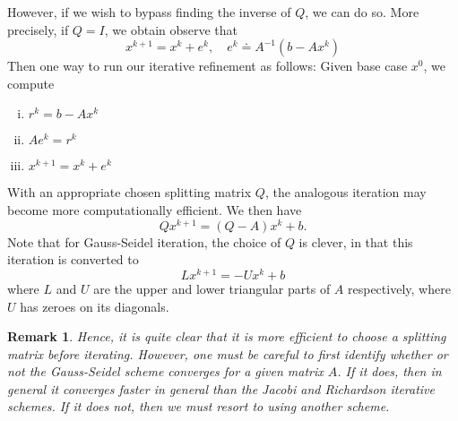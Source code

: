 \documentclass[12pt,reqno]{amsart}
\numberwithin{equation}{section}  %
\newtheorem{remark}[theorem]{Remark}
\begin{document}
However, if we wish to bypass finding the inverse of $Q$, we can do so. More precisely, if
$Q = I$, we obtain
observe that
\begin{equation*}
x^{k+1} = x^{k} + e^{k}, \quad e^{k} \doteq A^{-1}(b - Ax^{k})
\end{equation*}
Then one way to run our iterative refinement as follows: Given base case $x^{0}$, we compute 
\begin{enumerate}[i)]
\item $r^{k} = b - Ax^{k}$
\item $Ae^{k} = r^{k}$
\item $x^{k+1} = x^{k} + e^{k}$
\end{enumerate}
With an appropriate chosen splitting matrix $Q$, the analogous iteration may become
more computationally efficient. We then have
\begin{equation*}
Qx^{k+1} = (Q - A)x^{k} + b.
\end{equation*}
Note that for Gauss-Seidel iteration, the choice of $Q$ is clever, in that this
iteration  is converted to 
\begin{equation*}
L x^{k+1} = - U x^{k} + b
\end{equation*}
where $L$ and $U$ are the upper and lower triangular parts of $A$ respectively,
where $U$ has zeroes on its diagonals. 

\begin{remark}
Hence, it is quite clear that it is more efficient to choose a splitting matrix
before iterating. However, one must be careful to first identify whether or not
the Gauss-Seidel scheme converges for a given matrix $A$. If it does, then in
general it converges faster in general than the Jacobi and Richardson iterative
schemes. If it does not, then we must resort to using another scheme.
\end{remark}
\end{document}
